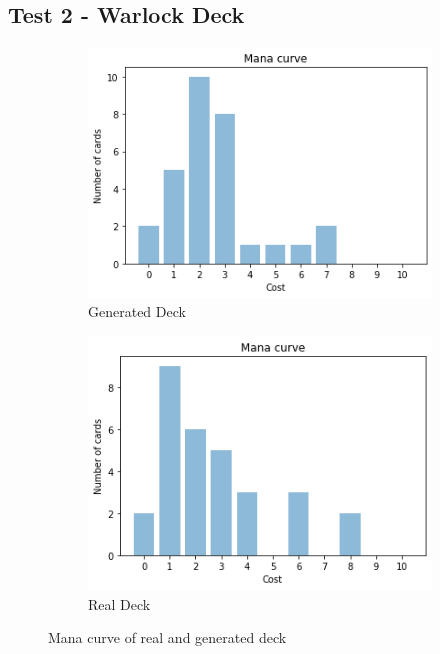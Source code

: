 \documentclass{report} %
\begin{document}
\subsection{Test 2 - Warlock Deck}
\begin{figure}[H]
\centering
\begin{subfigure}{.5\textwidth}
 \centering
 \includegraphics[width=.75\linewidth]{TestImages/WarlockDeckManaCurveFake}
 \caption{Generated Deck}
\end{subfigure}%
\begin{subfigure}{.5\textwidth}
 \centering
 \includegraphics[width=.75\linewidth]{TestImages/WarlockDeckManaCurveReal}
 \caption{Real Deck}
\end{subfigure}
\caption{Mana curve of real and generated deck}
\end{figure}
\end{document}
